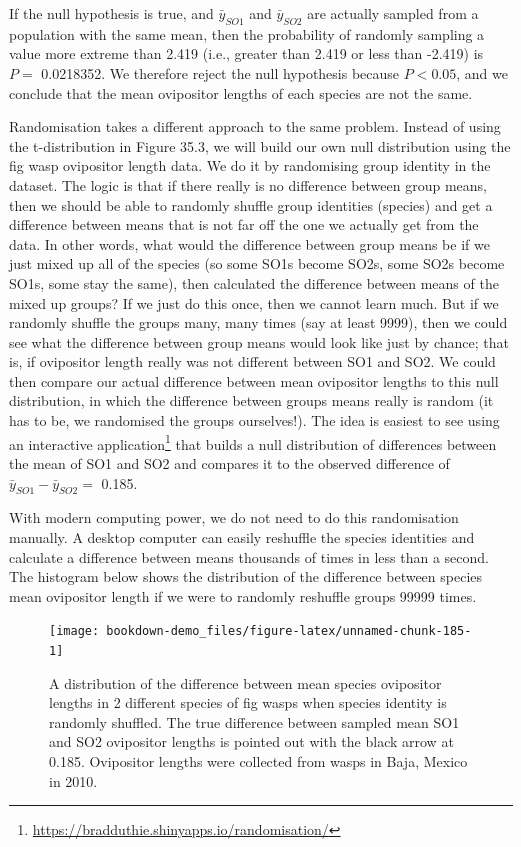 \documentclass[
]{scrbook}
\begin{document}
If the null hypothesis is true, and \(\bar{y}_{SO1}\) and \(\bar{y}_{SO2}\) are actually sampled from a population with the same mean, then the probability of randomly sampling a value more extreme than 2.419 (i.e., greater than 2.419 or less than -2.419) is \(P =\) 0.0218352.
We therefore reject the null hypothesis because \(P < 0.05\), and we conclude that the mean ovipositor lengths of each species are not the same.

Randomisation takes a different approach to the same problem.
Instead of using the t-distribution in Figure 35.3, we will build our own null distribution using the fig wasp ovipositor length data.
We do it by randomising group identity in the dataset.
The logic is that if there really is no difference between group means, then we should be able to randomly shuffle group identities (species) and get a difference between means that is not far off the one we actually get from the data.
In other words, what would the difference between group means be if we just mixed up all of the species (so some SO1s become SO2s, some SO2s become SO1s, some stay the same), then calculated the difference between means of the mixed up groups?
If we just do this once, then we cannot learn much.
But if we randomly shuffle the groups many, many times (say at least 9999), then we could see what the difference between group means would look like just by chance; that is, if ovipositor length really was not different between SO1 and SO2.
We could then compare our actual difference between mean ovipositor lengths to this null distribution, in which the difference between groups means really is random (it has to be, we randomised the groups ourselves!).
The idea is easiest to see using an interactive application\footnote{\url{https://bradduthie.shinyapps.io/randomisation/}} that builds a null distribution of differences between the mean of SO1 and SO2 and compares it to the observed difference of \(\bar{y}_{SO1} - \bar{y}_{SO2} =\) 0.185.

With modern computing power, we do not need to do this randomisation manually.
A desktop computer can easily reshuffle the species identities and calculate a difference between means thousands of times in less than a second.
The histogram below shows the distribution of the difference between species mean ovipositor length if we were to randomly reshuffle groups 99999 times.

\begin{figure}
\texttt{[image: bookdown-demo\_files/figure-latex/unnamed-chunk-185-1]} \caption{A distribution of the difference between mean species ovipositor lengths in 2 different species of fig wasps when species identity is randomly shuffled. The true difference between sampled mean SO1 and SO2 ovipositor lengths is pointed out with the black arrow at 0.185. Ovipositor lengths were collected from wasps in Baja, Mexico in 2010.}\label{fig:unnamed-chunk-185}
\end{figure}
\end{document}
